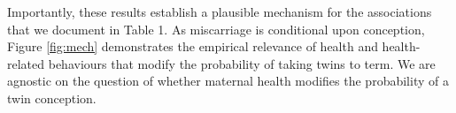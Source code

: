 \documentclass{nature}
\begin{document}
\begin{linenumbers}
Importantly, these results establish a plausible mechanism for the associations that we document in Table 1. %
As miscarriage is conditional upon conception, Figure \ref{fig:mech} demonstrates the empirical relevance of health and health-related behaviours that modify the probability of taking twins to term. %
We are agnostic on the question of whether maternal health modifies the probability of a twin conception.



\end{linenumbers}
\end{document}
